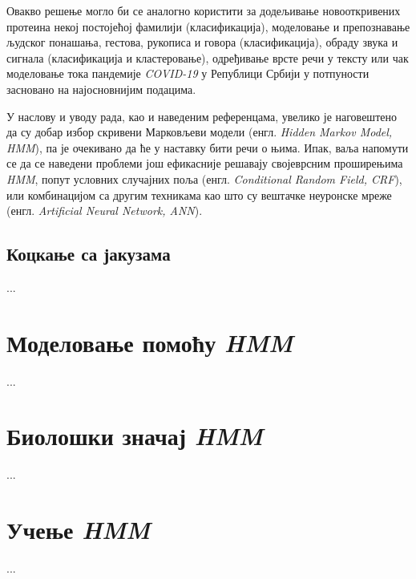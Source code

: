 \documentclass[12pt,oneside]{memoir}
\begin{document}
Овакво решење могло би се аналогно користити за додељивање новооткривених протеина некој постојећој фамилији\cite{nguyen2016} (класификација), моделовање и препознавање људског понашања, гестова, рукописа и говора\cite{gales2007} (класификација), обраду звука и сигнала\cite{andreao2006} (класификација и кластеровање), одређивање врсте речи у тексту\cite{mutjaba2020} или чак моделовање тока пандемије \textit{COVID-19} у Републици Србији у потпуности засновано на најосновнијим подацима\cite{vasovic2021}.

У наслову и уводу рада, као и наведеним референцама, увелико је наговештено да су добар избор скривени Марковљеви модели (енгл. \textit{Hidden Markov Model, HMM}), па је очекивано да ће у наставку бити речи о њима. Ипак, ваља напомути се да се наведени проблеми још ефикасније решавају својеврсним проширењима \textit{HMM}, попут условних случајних поља\cite{ponomareva2007} (енгл. \textit{Conditional Random Field, CRF}), или комбинацијом са другим техникама као што су вештачке неуронске мреже\cite{cohen1999} (енгл. \textit{Artificial Neural Network, ANN}).

\section{Коцкање са јакузама}
...

\chapter{Моделовање помоћу \textit{HMM}}
...

\chapter{Биолошки значај \textit{HMM}}
...

\chapter{Учење \textit{HMM}}
...
\end{document}
